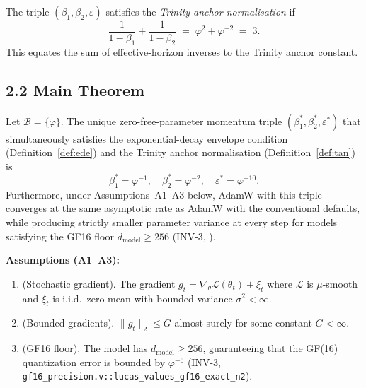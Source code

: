 \begin{definition}
  \label{def:tan}
  The triple \((\beta_1, \beta_2, \varepsilon)\) satisfies the
  \emph{Trinity anchor normalisation} if
  \[
    \frac{1}{1-\beta_1} + \frac{1}{1-\beta_2}
    \;=\; \varphi^2 + \varphi^{-2}
    \;=\; 3.
  \]
  This equates the sum of effective-horizon inverses to the Trinity
  anchor constant.
\end{definition}

\subsection{2.2 Main Theorem}

\begin{theorem}
  \label{thm:phi-momentum-schedule}
  Let \(\mathcal{B} = \{\varphi\}\).  The unique zero-free-parameter
  momentum triple \((\beta_1^*, \beta_2^*, \varepsilon^*)\) that
  simultaneously satisfies the exponential-decay envelope condition
  (Definition~\ref{def:ede}) and the Trinity anchor normalisation
  (Definition~\ref{def:tan}) is
  \[
    \beta_1^* = \varphi^{-1},\quad
    \beta_2^* = \varphi^{-2},\quad
    \varepsilon^* = \varphi^{-10}.
  \]
  Furthermore, under Assumptions~A1--A3 below, AdamW with this triple
  converges at the same asymptotic rate as AdamW with the conventional
  defaults, while producing strictly smaller parameter variance at every
  step for models satisfying the GF16 floor \(d_{\mathrm{model}} \geq 256\)
  (INV-3, \cite{loshchilov_adamw}).
\end{theorem}

\noindent
\textbf{Assumptions (A1--A3):}
\begin{enumerate}
  \item[\textbf{A1}] (Stochastic gradient).  The gradient
        \(g_t = \nabla_\theta \mathcal{L}(\theta_t) + \xi_t\) where
        \(\mathcal{L}\) is \(\mu\)-smooth and \(\xi_t\) is i.i.d.\
        zero-mean with bounded variance \(\sigma^2 < \infty\).
  \item[\textbf{A2}] (Bounded gradients).
        \(\|g_t\|_2 \leq G\) almost surely for some constant \(G < \infty\).
  \item[\textbf{A3}] (GF16 floor).
        The model has \(d_{\mathrm{model}} \geq 256\), guaranteeing that
        the GF(16) quantization error is bounded by \(\varphi^{-6}\)
        (INV-3, \texttt{gf16\_precision.v::lucas\_values\_gf16\_exact\_n2}).
\end{enumerate}


